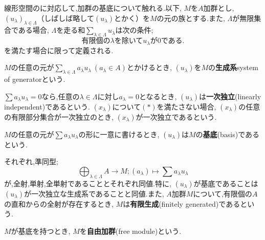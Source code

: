 線形空間のに対応して,加群の基底について触れる.以下, $M$を$A$加群とし, $(u_\lambda)_{\lambda\in\Lambda}$（しばしば略して$(u_\lambda)$とかく）を$M$の元の族とする.また, $\Lambda$が無限集合である場合, $\Lambda$を走る和$\sum_{\lambda\in\Lambda} u_\lambda$は次の条件;
\[\text{有限個の}\lambda\text{を除いて}u_\lambda\text{が0である.}\tag{$\ast$}\]
を満たす場合に限って定義される.

\begin{defi}[生成系]
	$M$の任意の元が$\sum_{\lambda\in\Lambda}a_\lambda u_\lambda ~(a_\lambda\in A)$とかけるとき, $(u_\lambda)$を$M$の\textbf{生成系}{system of generator}という.
\end{defi}
\begin{defi}[一次独立]
	$\sum a_\lambda u_\lambda=0$なら,任意の$\lambda\in\Lambda$に対し$a_\lambda=0$となるとき, $(u_\lambda)$は\textbf{一次独立}(linearly independent)であるという. $(x_\lambda)$について$(\ast)$を満たさない場合, $(x_\lambda)$の任意の有限部分集合が一次独立のとき, $(x_\lambda)$が一次独立であるという.
\end{defi}
\begin{defi}[基底]
	$M$の任意の元が$\sum a_\lambda u_\lambda$の形に一意に書けるとき, $(u_\lambda)$は$M$の\textbf{基底}(basis)であるという.	
\end{defi}

それぞれ,準同型;
\[\bigoplus_{\lambda\in\Lambda} A\to M;(a_\lambda)\mapsto\sum a_\lambda u_\lambda\]
が,全射,単射,全単射であることとそれぞれ同値.特に, $(u_\lambda)$が基底であることは$(u_\lambda)$が一次独立な生成系であることと同値.また, $A$加群$M$について,有限個の$A$の直和からの全射が存在するとき, $M$は\textbf{有限生成}(finitely generated)であるという.

\begin{defi}[自由加群]
	$M$が基底を持つとき, $M$を\textbf{自由加群}(free module)という.
\end{defi}

